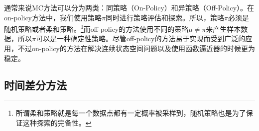 通常来说MC方法可以分为两类：同策略（On-Policy）和异策略（Off-Policy）。在on-policy方法中，我们使用策略$\pi$同时进行策略评估和探索。所以，策略$\pi$必须是随机策略或者柔和策略。\footnote{所谓柔和策略就是每一个数据点都有一定概率被采样到，随机策略也是为了保证这种探索的完备性。}而off-policy的方法使用不同的策略$\mu \neq \pi$来产生样本数据，所以$\pi$可以是一种确定性策略。尽管off-policy的方法易于实现而受到广泛的应用，不过on-policy的方法在解决连续状态空间问题以及使用函数逼近器的时候更为稳定。











\subsection{时间差分方法}

